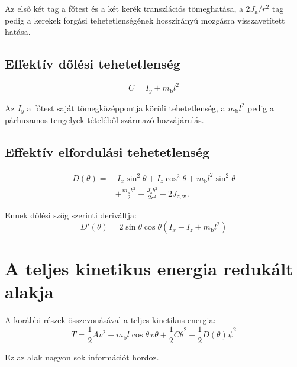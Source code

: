 \documentclass[12pt,a4paper]{article}
\newcommand{\mbody}{m_{\mathrm{b}}}
\newcommand{\mwheel}{m_{\mathrm{w}}}
\newcommand{\Jspin}{J_{\mathrm{a}}}
\newcommand{\Jzw}{J_{z,\mathrm{w}}}
\begin{document}
	Az első két tag a főtest és a két kerék transzlációs tömeghatása, a $2\Jspin/r^2$ tag pedig a kerekek forgási tehetetlenségének hosszirányú mozgásra visszavetített hatása.
	
	\subsection{Effektív dőlési tehetetlenség}
	
	\begin{equation}
		\boxed{
			C=I_y+\mbody l^2
		}
	\end{equation}
	
	Az $I_y$ a főtest saját tömegközéppontja körüli tehetetlenség, a $\mbody l^2$ pedig a párhuzamos tengelyek tételéből származó hozzájárulás.
	
	\subsection{Effektív elfordulási tehetetlenség}
	
	\begin{equation}
		\boxed{
			\begin{aligned}
				D(\theta)=&\ I_x\sin^2\theta
				+I_z\cos^2\theta
				+\mbody l^2\sin^2\theta\\
				&+\frac{\mwheel b^2}{2}
				+\frac{\Jspin b^2}{2r^2}
				+2\Jzw.
			\end{aligned}
		}
	\end{equation}
	
	Ennek dőlési szög szerinti deriváltja:
	\begin{equation}
		\boxed{
			D'(\theta)
			=2\sin\theta\cos\theta
			\left(I_x-I_z+\mbody l^2\right)
		}
	\end{equation}
	
	\section{A teljes kinetikus energia redukált alakja}
	
	A korábbi részek összevonásával a teljes kinetikus energia:
	\begin{equation}
		\boxed{
			T=
			\frac{1}{2}Av^2
			+\mbody l\cos\theta\,v\dot\theta
			+\frac{1}{2}C\dot\theta^2
			+\frac{1}{2}D(\theta)\dot\psi^2
		}
	\end{equation}
	
	Ez az alak nagyon sok információt hordoz.
	
\end{document}
